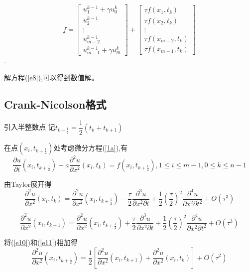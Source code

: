 \documentclass[withoutpreface,bwprint]{cumcmthesis} %
\begin{document}
$$f=
\begin{bmatrix}
u_1^{k-1}+\gamma u_0^k\\
u_2^{k-1}\\
\vdots\\
u_{m-2}^{k-1} \\
u_{m-1}^{k-1}+\gamma u_m^k
\end{bmatrix}
+
\begin{bmatrix}
\tau f(x_1,t_k)\\
\tau f(x_2,t_k)\\
\vdots\\
\tau f(x_{m-2},t_k) \\
\tau f(x_{m-1},t_k)
\end{bmatrix}
$$.

解方程(\ref{e8}),可以得到数值解。

\subsection{Crank-Nicolson格式}
引入半整数点
记$t_{k+\frac{1}{2}}=\dfrac{1}{2}(t_k+t_{k+1})$

在点$ (x_i,t_{k+\frac{1}{2}}) $处考虑微分方程(\ref{1a}),有
\begin{equation}
\label{e9}
\dfrac{\partial{u}}{\partial{t}}(x_i,t_{k+\frac{1}{2}})-a\dfrac{\partial^2{u}}{\partial{x^2}}(x_i,t_k)=f(x_i,t_{k+\frac{1}{2}}), 1 \leq i \leq m-1,0 \leq k \leq n-1
\end{equation}

由Taylor展开得
\begin{equation}
\label{e10}
\dfrac{\partial^2{u}}{\partial{x}^2}(x_i,t_k)=\dfrac{\partial^2{u}}{\partial{x}^2}(x_i,t_{k+\frac{1}{2}})-\dfrac{\tau}{2}\dfrac{\partial^3{u}}{\partial{x}^2\partial{t}}+\dfrac{1}{2}(\dfrac{\tau}{2})^2\dfrac{\partial^4{u}}{\partial{x}^2\partial{t}^2}+O(\tau^3)
\end{equation}

\begin{equation}
\label{e11}
\dfrac{\partial^2{u}}{\partial{x}^2}(x_i,t_{k+1})=\dfrac{\partial^2{u}}{\partial{x}^2}(x_i,t_{k+\frac{1}{2}})+\dfrac{\tau}{2}\dfrac{\partial^3{u}}{\partial{x}^2\partial{t}}+\dfrac{1}{2}(\dfrac{\tau}{2})^2\dfrac{\partial^4{u}}{\partial{x}^2\partial{t}^2}+O(\tau^3)
\end{equation}

将(\ref{e10})和(\ref{e11})相加得
\begin{equation}
\label{e12}
\dfrac{\partial^2{u}}{\partial{x}^2}(x_i,t_{k+\frac{1}{2}})=\dfrac{1}{2}[\dfrac{\partial^2{u}}{\partial{x}^2}(x_i,t_{k+1})+\dfrac{\partial^2{u}}{\partial{x}^2}(x_i,t_{k})]+O(\tau^2)
\end{equation}
\end{document}

